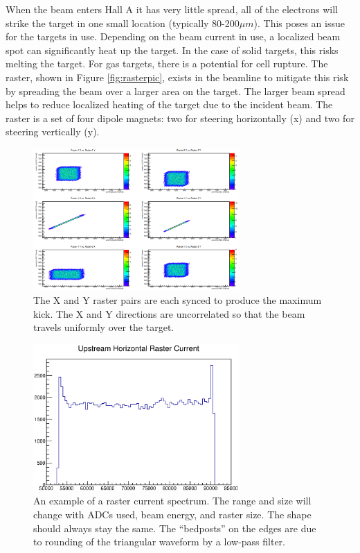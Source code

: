 When the beam enters Hall A it has very little spread, all of the electrons will strike the target in one small location (typically 80-200$\mu m$). This poses an issue for the targets in use. Depending on the beam current in use, a localized beam spot can significantly heat up the target. In the case of solid targets, this risks melting the target. For gas targets, there is a potential for cell rupture. The raster, shown in Figure \ref{fig:rasterpic}, exists in the beamline to mitigate this risk by spreading the beam over a larger area on the target. The larger beam spread helps to reduce localized heating of the target due to the incident beam. The raster is a set of four dipole magnets: two for steering horizontally (x) and two for steering vertically (y).\cite{Bob}

\begin{figure}[h]
\begin{center}
	\includegraphics[width=0.7\textwidth]{./setup/fig/raster_sync.png}
	\caption{The X and Y raster pairs are each synced to produce the maximum kick. The X and Y directions are uncorrelated so that the beam travels uniformly over the target.}
	\label{fig:raster}
\end{center}
\end{figure}

\begin{figure}[h!]
\begin{center}
	\includegraphics[width=0.7\textwidth]{./setup/fig/ex_rast.eps}
	\caption{An example of a raster current spectrum. The range and size will change with ADCs used, beam energy, and raster size. The shape should always stay the same. The ``bedposts'' on the edges are due to rounding of the triangular waveform by a low-pass filter.}
	\label{fig:exrast}
\end{center}
\end{figure}

